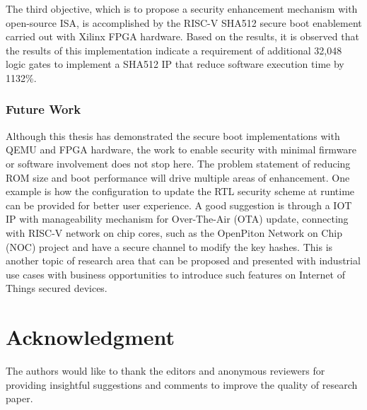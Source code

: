 \documentclass[a4paper,fleqn]{cas-dc}
\begin{document}
The third objective, which is to propose a security enhancement mechanism with open-source ISA, is accomplished by the RISC-V SHA512 secure boot enablement carried out with Xilinx FPGA hardware. Based on the results, it is observed that the results of this implementation indicate a requirement of additional 32,048 logic gates to implement a SHA512 IP that reduce software execution time by 1132\%.


\subsubsection{Future Work}
Although this thesis has demonstrated the secure boot implementations with QEMU and FPGA hardware, the work to enable security with minimal firmware or software involvement does not stop here. The problem statement of reducing ROM size and boot performance will drive multiple areas of enhancement. One example is how the configuration to update the RTL security scheme at runtime can be provided for better user experience. A good suggestion is through a IOT IP with manageability mechanism for Over-The-Air (OTA) update, connecting with RISC-V network on chip cores, such as the OpenPiton Network on Chip (NOC) project and have a secure channel to modify the key hashes. This is another topic of research area that can be proposed and presented with industrial use cases with business opportunities to introduce such features on Internet of Things secured devices.

\section*{Acknowledgment}
The authors would like to thank the editors and anonymous
reviewers for providing insightful suggestions and comments
to improve the quality of research paper.

\vskip6pt
\end{document}
